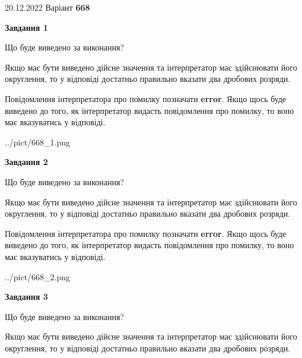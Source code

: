 \documentclass[12pt, ukrainian]{article}
\begin{document}
{20.12.2022 Варіант \No \textbf { 668 }\par}
{
\begin {Large}

{\begin {center}\textbf{Завдання 1}\end {center}}\par
Що буде виведено за виконання? \par

Якщо має бути виведено дійсне значення та інтерпретатор має здійснювати його округлення, 
то у відповіді достатньо правильно вказати два дробових розряди.

Повідомлення інтерпретатора про помилку позначати \textbf{error}.
Якщо щось буде виведено до того, як інтерпретатор видасть повідомлення про помилку, 
то воно має вказуватись у відповіді. \par

\begin{center}
	{../pict/668_1.png}
\end{center}
\newpage

{\begin {center}\textbf{Завдання 2}\end {center}}\par
Що буде виведено за виконання? \par

Якщо має бути виведено дійсне значення та інтерпретатор має здійснювати його округлення, 
то у відповіді достатньо правильно вказати два дробових розряди.

Повідомлення інтерпретатора про помилку позначати \textbf{error}.
Якщо щось буде виведено до того, як інтерпретатор видасть повідомлення про помилку, 
то воно має вказуватись у відповіді. \par

\begin{center}
	{../pict/668_2.png}
\end{center}
\newpage

{\begin {center}\textbf{Завдання 3}\end {center}}\par
Що буде виведено за виконання? \par

Якщо має бути виведено дійсне значення та інтерпретатор має здійснювати його округлення, 
то у відповіді достатньо правильно вказати два дробових розряди.


\end{Large}}
\end{document}
